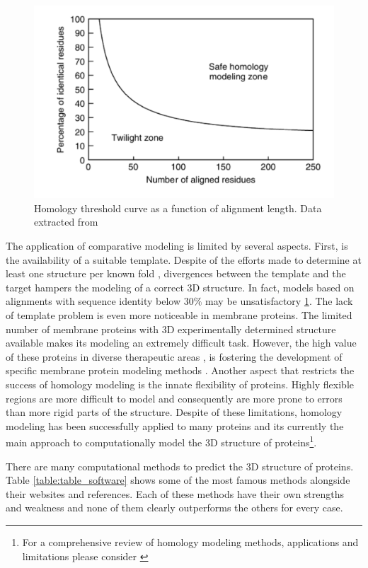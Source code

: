 \documentclass[12pt, b5paper,twoside]{tesi_upf}
\begin{document}
\begin{figure}[htbp]

  \centering
  	\includegraphics[scale=0.35]{../figures/homology_plot.pdf} %

	\caption[Homology threshold curve as a function of alignment length]{Homology threshold curve as a function of alignment length. Data extracted from \cite{Sander1991}}
	\label{fig:homology_modeling}
\end{figure}
\par The application of comparative modeling is limited by several aspects. First, is the availability of a suitable template. Despite of the efforts made to determine at least one structure per known fold \cite{Norvell2007}, divergences between the template and the target hampers the modeling of a correct 3D structure. In fact, models based on alignments with sequence identity below 30$\%$ may be unsatisfactory \ref{fig:homology_modeling}. The lack of template problem is even more noticeable in membrane proteins. The limited number of membrane proteins with 3D experimentally determined structure available makes its modeling an extremely difficult task. However, the high value of these proteins in diverse therapeutic areas \cite{Du2012, Kampen2011}, is fostering the development of specific membrane protein modeling methods \cite{Leman2015}. Another aspect that restricts the success of homology modeling is the innate flexibility of proteins. Highly flexible regions are more difficult to model and consequently are more prone to errors than more rigid parts of the structure. Despite of these limitations, homology modeling has been successfully applied to many proteins and its currently the main approach to computationally model the 3D structure of proteins\footnote{For a comprehensive review of homology modeling methods, applications and limitations please consider \cite{Marti-Renom2000, Malmstrom2010}}. 
\par There are many computational methods to predict the 3D structure of proteins. Table \ref{table:table_software} shows some of the most famous methods alongside their websites and references. Each of these methods have their own strengths and weakness and none of them clearly outperforms the others for every case.
 
\end{document}
